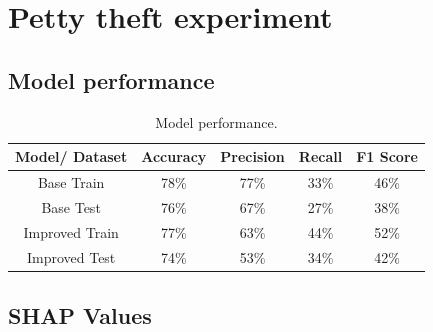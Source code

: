 \documentclass[fleqn,10pt]{wlscirep}
\begin{document}
\section{Petty theft experiment}

\subsection{Model performance}

\begin{table}[!htb]
\centering
\begin{tabular}{|c|c|c|c|c|}
\hline

\textbf{Model/ Dataset} & \textbf{Accuracy} & \textbf{Precision} & \textbf{Recall} & \textbf{F1 Score} \\ \hline
     Base Train &     78\% &     77\% &   33\% &     46\% \\
      Base Test &     76\% &     67\% &   27\% &     38\% \\
Improved Train &     77\% &      63\% &   44\% &     52\% \\
 Improved Test &     74\% &      53\% &   34\% &     42\% \\

\hline
\end{tabular}
\caption{Model performance.}
\end{table}



\subsection{SHAP Values}
\end{document}
